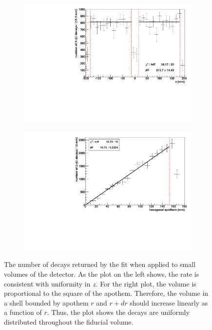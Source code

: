 \documentclass[herrin-thesis.tex]{subfiles}
\begin{document}
\begin{figure}[htbp]
	\begin{subfigure}[c]{0.48\textwidth}
	\centering
	\includegraphics[width=\textwidth]{./plots/analysis_bb2n_rate_v_z.pdf}
	\end{subfigure}\hfill%
	\begin{subfigure}[c]{0.48\textwidth}
	\centering
	\includegraphics[width=\textwidth]{./plots/analysis_bb2n_rate_v_apothem.pdf}
	\end{subfigure}
\caption[Number of \twonu{} decays vs. position]{The number of \twonu{} decays returned by the fit when applied to small volumes of the detector. As the plot on the left shows, the rate is consistent with uniformity in \(z\). For the right plot, the volume is proportional to the square of the apothem. Therefore, the volume in a shell bounded by apothem \(r\) and \(r+dr\) should increase linearly as a function of \(r\). Thus, the plot shows the \twonu{} decays are uniformly distributed throughout the fiducial volume.}
\label{fig:analysis_bb2n_rate_v_pos}
\end{figure}
\end{document}
